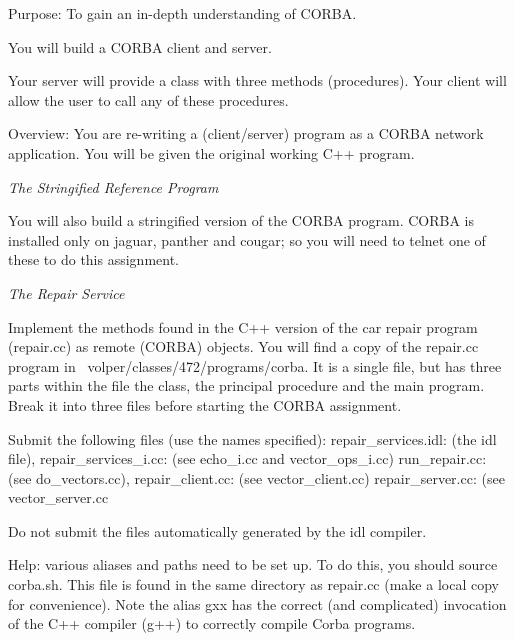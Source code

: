 

\parindent 0pt

Purpose: To gain an in-depth understanding of
CORBA.

You will build a CORBA client and server.

Your server will provide a class with three methods (procedures).
Your client will allow the user to call any of these procedures.

Overview: You are re-writing a (client/server) program as
a CORBA network application.
You will be given the original working C++ program.

{\it The Stringified Reference Program} 

You will also build a stringified version of the CORBA program.
CORBA is installed only on jaguar, panther and cougar;
so you will need to telnet one of these to do this assignment.

{\it The Repair Service}

Implement the methods found in the C++ version of the car repair program
({\ltt{}repair.cc}) as remote (CORBA) objects.
You will find a copy of the {\ltt{}repair.cc} program in
{\ltt{}~volper/classes/472/programs/corba}.
It is a single file, but has three parts within the file
the class, the principal procedure and the main program.
Break it into three files before starting the CORBA assignment.

Submit the following files (use the names specified):
\hfill\break
{\ltt{}repair_services.idl}: (the idl file), 
\hfill\break
{\ltt{}repair_services_i.cc}: (see {\ltt{}echo_i.cc} and {\ltt{}vector_ops_i.cc})
\hfill\break
{\ltt{}run_repair.cc}: (see {\ltt{}do_vectors.cc}),
\hfill\break
{\ltt{}repair_client.cc}: (see {\ltt{}vector_client.cc})
\hfill\break
{\ltt{}repair_server.cc}: (see {\ltt{}vector_server.cc} 

Do not submit the files automatically generated by the idl compiler.

Help: various aliases and paths need to be set up. To do this,
you should {\ltt{}source corba.sh}. This file is found in the
same directory as {\ltt{}repair.cc} (make a local copy for convenience).
Note the alias {\ltt{}gxx} has the correct (and complicated) invocation
of the {\ltt{}C++} compiler ({\ltt{}g++}) to correctly compile Corba programs.

\bye
